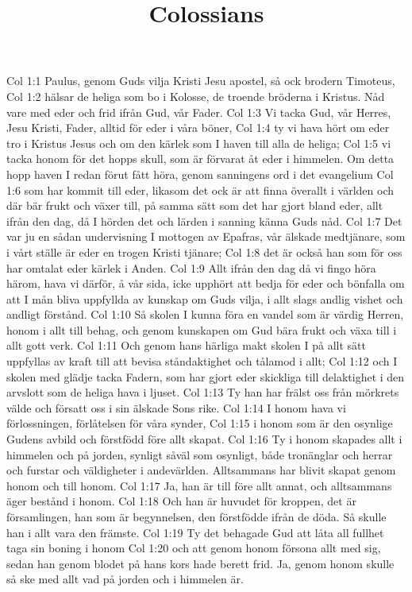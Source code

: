 

\title{Colossians}

Col 1:1  Paulus, genom Guds vilja Kristi Jesu apostel, så ock brodern Timoteus,
Col 1:2  hälsar de heliga som bo i Kolosse, de troende bröderna i Kristus. Nåd vare med eder och frid ifrån Gud, vår Fader.
Col 1:3  Vi tacka Gud, vår Herres, Jesu Kristi, Fader, alltid för eder i våra böner,
Col 1:4  ty vi hava hört om eder tro i Kristus Jesus och om den kärlek som I haven till alla de heliga;
Col 1:5  vi tacka honom för det hopps skull, som är förvarat åt eder i himmelen. Om detta hopp haven I redan förut fått höra, genom sanningens ord i det evangelium
Col 1:6  som har kommit till eder, likasom det ock är att finna överallt i världen och där bär frukt och växer till, på samma sätt som det har gjort bland eder, allt ifrån den dag, då I hörden det och lärden i sanning känna Guds nåd.
Col 1:7  Det var ju en sådan undervisning I mottogen av Epafras, vår älskade medtjänare, som i vårt ställe är eder en trogen Kristi tjänare;
Col 1:8  det är också han som för oss har omtalat eder kärlek i Anden.
Col 1:9  Allt ifrån den dag då vi fingo höra härom, hava vi därför, å vår sida, icke upphört att bedja för eder och bönfalla om att I mån bliva uppfyllda av kunskap om Guds vilja, i allt slags andlig vishet och andligt förstånd.
Col 1:10  Så skolen I kunna föra en vandel som är värdig Herren, honom i allt till behag, och genom kunskapen om Gud bära frukt och växa till i allt gott verk.
Col 1:11  Och genom hans härliga makt skolen I på allt sätt uppfyllas av kraft till att bevisa ståndaktighet och tålamod i allt;
Col 1:12  och I skolen med glädje tacka Fadern, som har gjort eder skickliga till delaktighet i den arvslott som de heliga hava i ljuset.
Col 1:13  Ty han har frälst oss från mörkrets välde och försatt oss i sin älskade Sons rike.
Col 1:14  I honom hava vi förlossningen, förlåtelsen för våra synder,
Col 1:15  i honom som är den osynlige Gudens avbild och förstfödd före allt skapat.
Col 1:16  Ty i honom skapades allt i himmelen och på jorden, synligt såväl som osynligt, både tronänglar och herrar och furstar och väldigheter i andevärlden. Alltsammans har blivit skapat genom honom och till honom.
Col 1:17  Ja, han är till före allt annat, och alltsammans äger bestånd i honom.
Col 1:18  Och han är huvudet för kroppen, det är församlingen, han som är begynnelsen, den förstfödde ifrån de döda. Så skulle han i allt vara den främste.
Col 1:19  Ty det behagade Gud att låta all fullhet taga sin boning i honom
Col 1:20  och att genom honom försona allt med sig, sedan han genom blodet på hans kors hade berett frid. Ja, genom honom skulle så ske med allt vad på jorden och i himmelen är.
